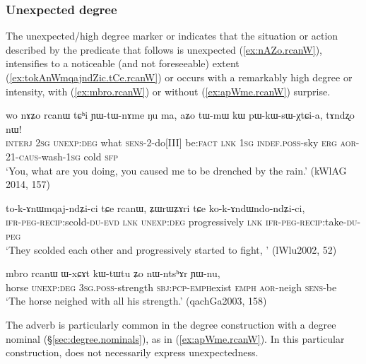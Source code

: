 \subsubsection{Unexpected degree} \label{sec:unexpected} 
The unexpected/high degree marker  or  indicates that the situation or action described by the predicate that follows is unexpected (\ref{ex:nAZo.rcanW}), intensifies to a noticeable (and not foreseeable) extent (\ref{ex:tokAnWmqajndZic.tCe.rcanW}) or occurs with a remarkably high degree or intensity, with  (\ref{ex:mbro.rcanW}) or without (\ref{ex:apWme.rcanW}) surprise.


\begin{exe}
	\ex \label{ex:nAZo.rcanW}
	\gll  wo nɤʑo rcanɯ tɕʰi ɲɯ-tɯ-nɤme ŋu ma,  aʑo tɯ-mɯ kɯ pɯ-kɯ-sɯ-χtɕi-a, tɤndʐo nɯ! \\
	\textsc{interj} \textsc{2sg} \textsc{unexp}:\textsc{deg} what \textsc{sens}-2-do[III] be:\textsc{fact} \textsc{lnk} \textsc{1sg} \textsc{indef}.\textsc{poss}-sky \textsc{erg} \textsc{aor}-2\fl{}1-\textsc{caus}-wash-\textsc{1sg} cold \textsc{sfp} \\
	\glt `You, what are you doing, you caused me to be drenched by the rain.' (kWlAG 2014, 157) \\
\end{exe}

\begin{exe}
	\ex \label{ex:tokAnWmqajndZic.tCe.rcanW}
	\gll to-k-ɤnɯmqaj-ndʑi-ci tɕe rcanɯ, ʑɯrɯʑɤri tɕe ko-k-ɤndɯndo-ndʑi-ci, \\
	\textsc{ifr}-\textsc{peg}-\textsc{recip}:scold-\textsc{du}-\textsc{evd} \textsc{lnk}  \textsc{unexp}:\textsc{deg} progressively \textsc{lnk}   \textsc{ifr}-\textsc{peg}-\textsc{recip}:take-\textsc{du}-\textsc{peg} \\
	\glt `They scolded each other and progressively started to fight, ' (lWlu2002, 52)
\end{exe}

\begin{exe}
	\ex \label{ex:mbro.rcanW}
	\gll mbro rcanɯ ɯ-xɕɤt kɯ-tɯ\redp{}tu ʑo nɯ-ntsʰɤr ɲɯ-nu, \\
	horse \textsc{unexp}:\textsc{deg} \textsc{3sg}.\textsc{poss}-strength \textsc{sbj}:\textsc{pcp}-\textsc{emph}\redp{}exist \textsc{emph} \textsc{aor}-neigh \textsc{sens}-be \\ 
	\glt `The horse neighed with all his strength.' (qachGa2003, 158)
\end{exe}

The adverb  is particularly common in the degree construction with a  degree nominal (§\ref{sec:degree.nominals}), as in (\ref{ex:apWme.rcanW}). In this particular construction,   does not necessarily express unexpectedness.

